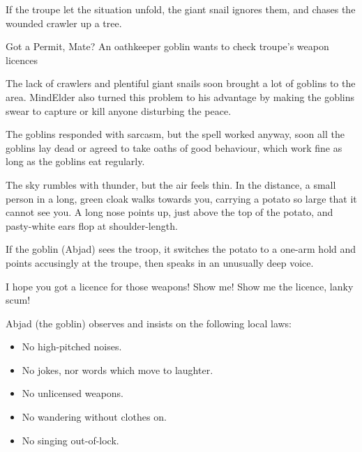 \begin{multicols}{2}
\giantSnail

\chitincrawler

If the troupe let the situation unfold, the giant snail ignores them, and chases the wounded \gls{crawler} up a tree.

{Got a Permit, Mate?}%
{An oathkeeper goblin wants to check troupe's weapon licences}%


\begin{exampletext}
  The lack of \glspl{crawler} and plentiful giant snails soon brought a lot of goblins to the area.
  \Gls{MindElder} also turned this problem to his advantage by making the goblins swear to capture or kill anyone disturbing the peace.

  The goblins responded with sarcasm, but the spell worked anyway, soon all the goblins lay dead or agreed to take oaths of good behaviour, which work fine as long as the goblins eat regularly.
\end{exampletext}

\begin{boxtext}
  The sky rumbles with thunder, but the air feels thin.
  In the distance, a small person in a long, green cloak walks towards you, carrying a potato so large that it cannot see you.
  A long nose points up, just above the top of the potato, and pasty-white ears flop at shoulder-length.
\end{boxtext}

If the goblin (Abjad) sees the troop, it switches the potato to a one-arm hold and points accusingly at the troupe, then speaks in an unusually deep voice.

\null
\begin{speechtext}
  I hope you got a licence for those weapons!
  Show me!
  Show me the licence, lanky scum!
\end{speechtext}

Abjad (the goblin) observes and insists on the following local laws:

\begin{itemize}
  \item
  No high-pitched noises.
  \item
  No jokes, nor words which move to laughter.
  \item
  No unlicensed weapons.
  \item
  No wandering without clothes on.
  \item
  No singing out-of-lock.
\end{itemize}


\end{multicols}

